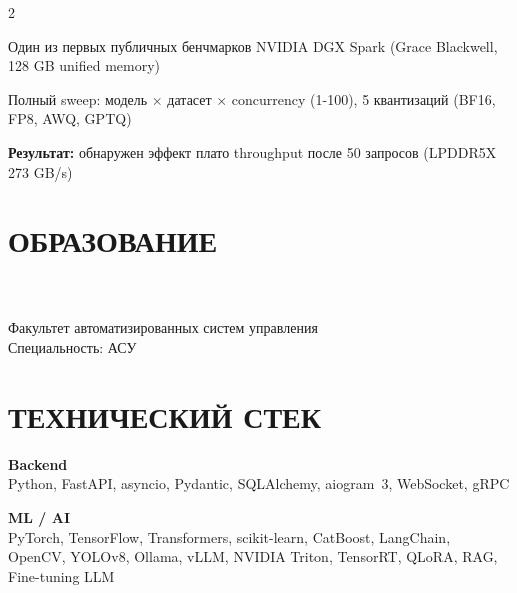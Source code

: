 \documentclass[]{deedy-resume-reversed}
\begin{document}
\begin{paracol}{2}
\\
\begin{tightemize}
\item Один из первых публичных бенчмарков NVIDIA DGX Spark (Grace Blackwell, 128 GB unified memory)
\item Полный sweep: модель $\times$ датасет $\times$ concurrency (1-100), 5 квантизаций (BF16, FP8, AWQ, GPTQ)
\item \textbf{Результат:} обнаружен эффект плато throughput после 50 запросов (LPDDR5X 273 GB/s)
\end{tightemize}


\switchcolumn

\section{ОБРАЗОВАНИЕ}

\\
\\[2pt]
{\fontsize{9pt}{11pt}\selectfont Факультет автоматизированных систем управления\\
Специальность: АСУ}
\sectionsep


\section{ТЕХНИЧЕСКИЙ СТЕК}

{\fontsize{9pt}{11pt}\selectfont
\textbf{Backend}\\
Python, FastAPI, asyncio, Pydantic, SQLAlchemy, aiogram~3, WebSocket, gRPC
\vspace{4pt}

\textbf{ML / AI}\\
PyTorch, TensorFlow, Transformers, scikit-learn, CatBoost, LangChain, OpenCV, YOLOv8, Ollama, vLLM, NVIDIA Triton, TensorRT, QLoRA, RAG, Fine-tuning LLM
\vspace{4pt}

}
\end{paracol}
\end{document}
